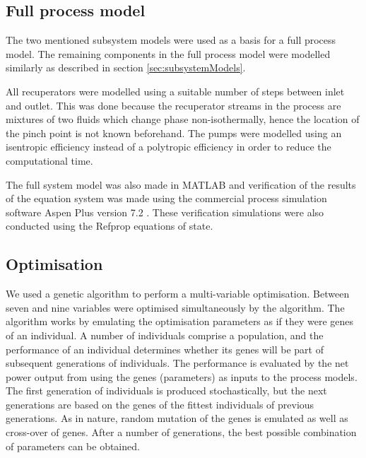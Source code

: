 \documentclass[review,3p]{elsarticle}
\begin{document}
\subsection{Full process model}
The two mentioned subsystem models were used as a basis for a full process model. The remaining components in the full process model were modelled similarly as described in section \ref{sec:subsystemModels}. 

All recuperators were modelled using a suitable number of steps between inlet and outlet. This was done because the recuperator streams in the process are mixtures of two fluids which change phase non-isothermally, hence the location of the pinch point is not known beforehand. The pumps were modelled using an isentropic efficiency instead of a polytropic efficiency in order to reduce the computational time.

The full system model was also made in MATLAB\textsuperscript{\textregistered} and verification of the results of the equation system was made using the commercial process simulation software Aspen Plus \textsuperscript{\textregistered} version 7.2 \cite{AspenTech2010}. These verification simulations were also conducted using the Refprop equations of state. 



\subsection{Optimisation}
We used a genetic algorithm \cite{Chipperfield1994} to perform a multi-variable optimisation. Between seven and nine variables were optimised simultaneously by the algorithm. The algorithm works by emulating the optimisation parameters as if they were genes of an individual. A number of individuals comprise a population, and the performance of an individual determines whether its genes will be part of subsequent generations of individuals. The performance is evaluated by the net power output from using the genes (parameters) as inputs to the process models. The first generation of individuals is produced stochastically, but the next generations are based on the genes of the fittest individuals of previous generations. As in nature, random mutation of the genes is emulated as well as cross-over of genes. After a number of generations, the best possible combination of parameters can be obtained. 
\end{document}
